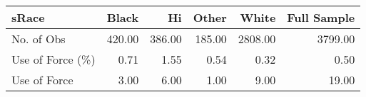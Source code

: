 \begin{tabular}{lrrrrr}
\toprule
sRace &  Black &     Hi &  Other &   White &  Full Sample \\
\midrule
No. of Obs       & 420.00 & 386.00 & 185.00 & 2808.00 &      3799.00 \\
Use of Force (\%) &   0.71 &   1.55 &   0.54 &    0.32 &         0.50 \\
Use of Force     &   3.00 &   6.00 &   1.00 &    9.00 &        19.00 \\
\bottomrule
\end{tabular}
